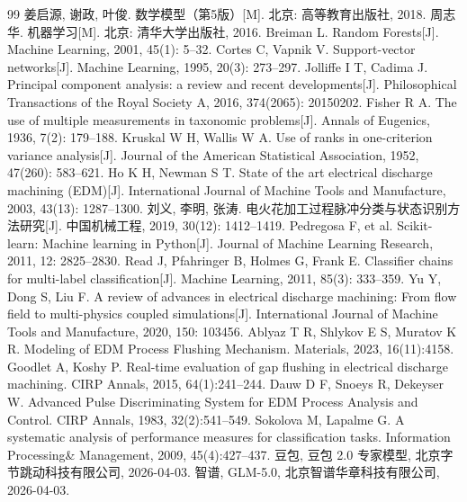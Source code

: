 \documentclass[UTF8,a4paper,12pt]{ctexart}
\begin{document}
\begin{thebibliography}{99}
 姜启源, 谢政, 叶俊. 数学模型（第5版）[M]. 北京: 高等教育出版社, 2018.
 周志华. 机器学习[M]. 北京: 清华大学出版社, 2016.
 Breiman L. Random Forests[J]. Machine Learning, 2001, 45(1): 5--32.
 Cortes C, Vapnik V. Support-vector networks[J]. Machine Learning, 1995, 20(3): 273--297.
 Jolliffe I T, Cadima J. Principal component analysis: a review and recent developments[J]. Philosophical Transactions of the Royal Society A, 2016, 374(2065): 20150202.
 Fisher R A. The use of multiple measurements in taxonomic problems[J]. Annals of Eugenics, 1936, 7(2): 179--188.
 Kruskal W H, Wallis W A. Use of ranks in one-criterion variance analysis[J]. Journal of the American Statistical Association, 1952, 47(260): 583--621.
 Ho K H, Newman S T. State of the art electrical discharge machining (EDM)[J]. International Journal of Machine Tools and Manufacture, 2003, 43(13): 1287--1300.
 刘义, 李明, 张涛. 电火花加工过程脉冲分类与状态识别方法研究[J]. 中国机械工程, 2019, 30(12): 1412--1419.
 Pedregosa F, et al. Scikit-learn: Machine learning in Python[J]. Journal of Machine Learning Research, 2011, 12: 2825--2830.
 Read J, Pfahringer B, Holmes G, Frank E. Classifier chains for multi-label classification[J]. Machine Learning, 2011, 85(3): 333--359.
 Yu Y, Dong S, Liu F. A review of advances in electrical discharge machining: From flow field to multi-physics coupled simulations[J]. International Journal of Machine Tools and Manufacture, 2020, 150: 103456.
 Ablyaz T R, Shlykov E S, Muratov K R. Modeling of EDM Process Flushing Mechanism. Materials, 2023, 16(11):4158.
 Goodlet A, Koshy P. Real-time evaluation of gap flushing in electrical discharge machining. CIRP Annals, 2015, 64(1):241–244.
 Dauw D F, Snoeys R, Dekeyser W. Advanced Pulse Discriminating System for EDM Process Analysis and Control. CIRP Annals, 1983, 32(2):541–549.
 Sokolova M, Lapalme G. A systematic analysis of performance measures for classification tasks. Information Processing\& Management, 2009, 45(4):427–437.
 豆包, 豆包 2.0 专家模型, 北京字节跳动科技有限公司, 2026-04-03.
 智谱,  GLM-5.0, 北京智谱华章科技有限公司, 2026-04-03.
\end{thebibliography}

\end{document}
